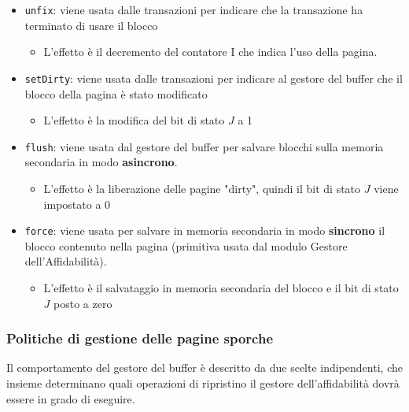 \documentclass[a4paper,twoside]{article}
\begin{document}
\begin{itemize}
\begin{enumerate}
      \item Quando una transazione accede ad una pagina per la prima volta il contatore
        si incrementa.
    \end{enumerate}

  \item \texttt{unfix}: viene usata dalle transazioni per indicare che la transazione
    ha terminato di usare il blocco
    \begin{itemize}
      \item L'effetto è il decremento del contatore I che indica l'uso della pagina.
    \end{itemize}

  \item \texttt{setDirty}: viene usata dalle transazioni per indicare al gestore del
    buffer che il blocco della pagina è stato modificato
    \begin{itemize}
      \item L'effetto è la modifica del bit di stato \( J \) a 1
    \end{itemize}

  \item \texttt{flush}: viene usata dal gestore del buffer per salvare blocchi sulla
    memoria secondaria in modo \textbf{asincrono}.
    \begin{itemize}
      \item L'effetto è la liberazione delle pagine "dirty", quindi il bit di stato
        \( J \) viene impostato a 0
    \end{itemize}

  \item \texttt{force}: viene usata per salvare in memoria secondaria in modo
    \textbf{sincrono} il blocco contenuto nella pagina (primitiva usata dal modulo
    Gestore dell’Affidabilità).
    \begin{itemize}
      \item L'effetto è il salvataggio in memoria secondaria del blocco e il bit di
        stato \( J \) posto a zero
    \end{itemize}
\end{itemize}

\subsubsection{Politiche di gestione delle pagine sporche}
Il comportamento del gestore del buffer è descritto da due scelte indipendenti, che
insieme determinano quali operazioni di ripristino il gestore dell'affidabilità dovrà
essere in grado di eseguire.
\end{document}
